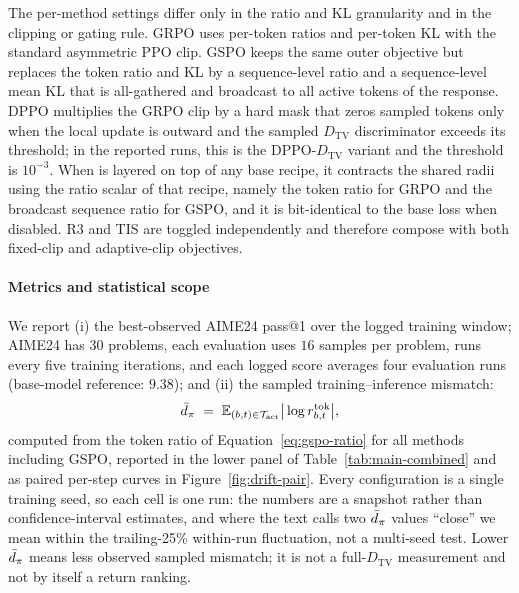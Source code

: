 The per-method settings differ only in the ratio and KL granularity and in the clipping or gating rule. GRPO uses per-token ratios and per-token KL with the standard asymmetric PPO clip. GSPO keeps the same outer objective but replaces the token ratio and KL by a sequence-level ratio and a sequence-level mean KL that is all-gathered and broadcast to all active tokens of the response. DPPO multiplies the GRPO clip by a hard mask that zeros sampled tokens only when the local update is outward and the sampled $D_{\mathrm{TV}}$ discriminator exceeds its threshold; in the reported runs, this is the DPPO-$D_{\mathrm{TV}}$ variant and the threshold is $10^{-3}$. When \satr{} is layered on top of any base recipe, it contracts the shared radii using the ratio scalar of that recipe, namely the token ratio for GRPO and the broadcast sequence ratio for GSPO, and it is bit-identical to the base loss when disabled. R3 and TIS are toggled independently and therefore compose with both fixed-clip and adaptive-clip objectives.

\paragraph{Metrics and statistical scope}
\label{app:metrics-scope}
We report (i) the best-observed AIME24 pass@1 over the logged training window; AIME24 has $30$ problems, each evaluation uses $16$ samples per problem, runs every five training iterations, and each logged score averages four evaluation runs (base-model reference: $9.38$); and (ii) the sampled training--inference mismatch:
\begin{equation}
\bar d_\pi\;=\;\mathbb{E}_{(b,t)\in\mathcal T_{\mathrm{act}}}\big|\log r^{\mathrm{tok}}_{b,t}\big|,
\label{eq:mismatch-metric}
\end{equation}
computed from the token ratio of Equation~\eqref{eq:gspo-ratio} for all methods including GSPO, reported in the lower panel of Table~\ref{tab:main-combined} and as paired per-step curves in Figure~\ref{fig:drift-pair}. Every configuration is a single training seed, so each cell is one run: the numbers are a snapshot rather than confidence-interval estimates, and where the text calls two $\bar d_\pi$ values ``close'' we mean within the trailing-25\% within-run fluctuation, not a multi-seed test. Lower $\bar d_\pi$ means less observed sampled mismatch; it is not a full-$D_{\mathrm{TV}}$ measurement and not by itself a return ranking.

